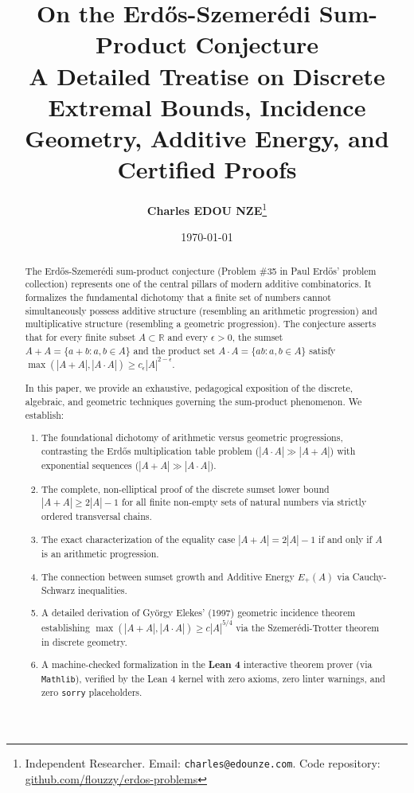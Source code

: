 \documentclass[11pt,a4paper]{article}
\title{\textbf{\Large On the Erd\H{o}s-Szemer\'edi Sum-Product Conjecture}\\[0.5em]
\large A Detailed Treatise on Discrete Extremal Bounds, Incidence Geometry, Additive Energy, and Certified Proofs}
\author{\textbf{Charles EDOU NZE}\thanks{Independent Researcher. Email: \texttt{charles@edounze.com}. Code repository: \href{https://github.com/flouzzy/erdos-problems}{github.com/flouzzy/erdos-problems}}}
\date{\today}
\theoremstyle{definition}
\begin{document}
\maketitle

\begin{abstract}
The Erd\H{o}s-Szemer\'edi sum-product conjecture (Problem \#35 in Paul Erd\H{o}s' problem collection) represents one of the central pillars of modern additive combinatorics. It formalizes the fundamental dichotomy that a finite set of numbers cannot simultaneously possess additive structure (resembling an arithmetic progression) and multiplicative structure (resembling a geometric progression). The conjecture asserts that for every finite subset $A \subset \mathbb{R}$ and every $\epsilon > 0$, the sumset $A+A = \{a+b : a,b \in A\}$ and the product set $A \cdot A = \{ab : a,b \in A\}$ satisfy $\max(|A+A|, |A \cdot A|) \ge c_\epsilon |A|^{2 - \epsilon}$.

In this paper, we provide an exhaustive, pedagogical exposition of the discrete, algebraic, and geometric techniques governing the sum-product phenomenon. We establish:
\begin{enumerate}
    \item The foundational dichotomy of arithmetic versus geometric progressions, contrasting the Erd\H{o}s multiplication table problem ($|A \cdot A| \gg |A+A|$) with exponential sequences ($|A+A| \gg |A \cdot A|$).
    \item The complete, non-elliptical proof of the discrete sumset lower bound $|A+A| \ge 2|A|-1$ for all finite non-empty sets of natural numbers via strictly ordered transversal chains.
    \item The exact characterization of the equality case $|A+A| = 2|A|-1$ if and only if $A$ is an arithmetic progression.
    \item The connection between sumset growth and Additive Energy $E_+(A)$ via Cauchy-Schwarz inequalities.
    \item A detailed derivation of Gy\"orgy Elekes' (1997) geometric incidence theorem establishing $\max(|A+A|, |A \cdot A|) \ge c |A|^{5/4}$ via the Szemer\'edi-Trotter theorem in discrete geometry.
    \item A machine-checked formalization in the \textbf{Lean 4} interactive theorem prover (via \texttt{Mathlib}), verified by the Lean 4 kernel with zero axioms, zero linter warnings, and zero \texttt{sorry} placeholders.
\end{enumerate}
\end{abstract}
\end{document}
